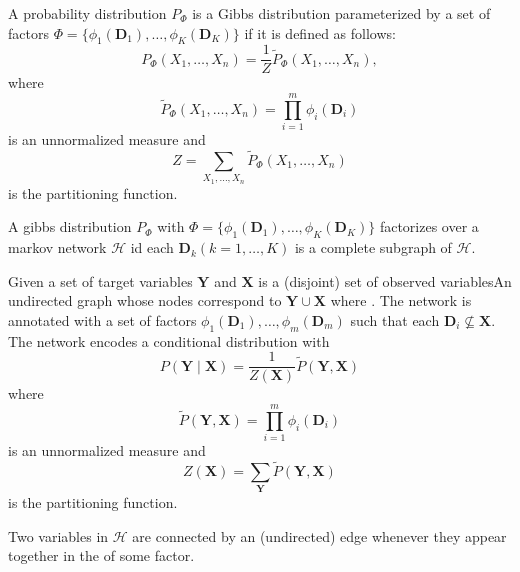 {%
  A \gls{probability distribution} $P_{\Phi}$ is a Gibbs distribution parameterized by a set of \glspl{factor} $\Phi=\{\phi_1(\bm{D}_1),\dots,\phi_K(\bm{D}_K)\}$ if it is defined as follows:
  \begin{equation*}
    P_{\Phi}(X_1,\dots,X_n)=\frac{1}{Z}\tilde{P}_{\Phi}(X_1,\dots,X_n),
  \end{equation*}
  where
  \begin{equation*}
    \tilde{P}_{\Phi}(X_1,\dots,X_n)=\prod_{i=1}^{m}\phi_i(\bm{D}_i)
  \end{equation*}
  is an unnormalized measure and
  \begin{equation*}
    Z=\sum_{X_1,\ldots,X_n}\tilde{P}_{\Phi}(X_1,\dots,X_n)
  \end{equation*}
  is the \gls{partitioning function}.
}

{%
  A \gls{gibbs distribution} $P_{\Phi}$ with $\Phi=\{\phi_1(\bm{D}_1),\dots,\phi_K(\bm{D}_K)\}$ factorizes over a \gls{markov
network} $\mathcal{H}$ id each $\bm{D}_{k}(k=1,\dots,K)$ is a \gls{complete subgraph} of $\mathcal{H}$.
}

{%
  Given a set of \glspl{target variable} $\bm{Y}$ and $\bm{X}$ is a (disjoint) set of \glspl{observed variable}An undirected \gls{graph} whose \glspl{node} correspond to $\bm{Y}\cup\bm{X}$ where . The network is annotated with a set of \glspl{factor} $\phi_1(\bm{D}_1),\dots,\phi_m(\bm{D}_m)$ such that each $\bm{D}_i\nsubseteq\bm{X}$. The network encodes a \gls{conditional distribution} with
  \begin{equation*}
    P(\bm{Y}\mid\bm{X})=\frac{1}{Z(\bm{X})}\tilde{P}(\bm{Y},\bm{X})
  \end{equation*}
  where
  \begin{equation*}
    \tilde{P}(\bm{Y},\bm{X})=\prod_{i=1}^{m}\phi_i(\bm{D}_i)
  \end{equation*}
  is an unnormalized measure and
  \begin{equation*}
    Z(\bm{X})=\sum_{\bm{Y}}\tilde{P}(\bm{Y},\bm{X})
  \end{equation*}
  is the \gls{partitioning function}.

  Two variables in $\mathcal{H}$ are connected by an (undirected) \gls{edge} whenever they appear together in the  of some \gls{factor}.
}



